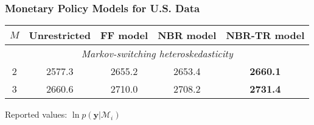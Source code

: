 \documentclass[notes,blackandwhite,mathsans,usenames,dvipsnames]{beamer}
\begin{document}
\begin{frame}
	\frametitle{Monetary Policy Models for  U.S. Data}


\begin{table}[h]
\begin{center}\small
\begin{tabular}{ccccc}
\toprule
$M$ & Unrestricted & FF model & NBR model & NBR-TR model \\
\midrule
\multicolumn{5}{c}{\textit{Markov-switching heteroskedasticity}} \\
2& 2577.3& 2655.2& 2653.4& \textbf{2660.1} \\
3& 2660.6& 2710.0& 2708.2& \textbf{2731.4} \\
\bottomrule
\end{tabular}

\smallskip
Reported values: $\ln p(\mathbf{y}|\mathcal{M}_i)$ 
\end{center}
\end{table}





\end{frame}
\end{document}
